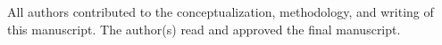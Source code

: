 All authors contributed to the conceptualization, methodology, and writing of this manuscript. The author(s) read and approved the final manuscript.


